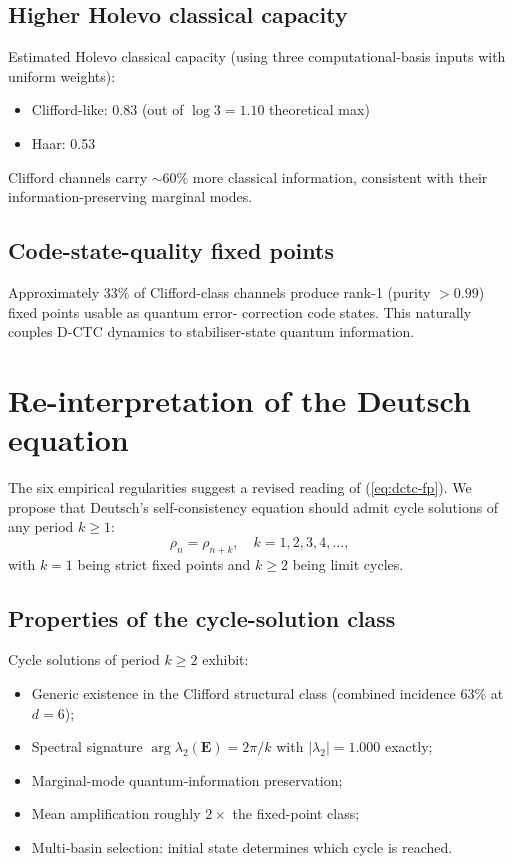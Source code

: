 \documentclass[11pt,a4paper]{article}
\begin{document}
\subsection{Higher Holevo classical capacity}

Estimated Holevo classical capacity (using three computational-basis
inputs with uniform weights):
\begin{itemize}
\item Clifford-like: 0.83 (out of $\log 3 = 1.10$ theoretical max)
\item Haar: 0.53
\end{itemize}
Clifford channels carry $\sim 60\%$ more classical information,
consistent with their information-preserving marginal modes.

\subsection{Code-state-quality fixed points}

Approximately $33\%$ of Clifford-class channels produce
rank-1 (purity $> 0.99$) fixed points usable as quantum error-
correction code states. This naturally couples D-CTC dynamics to
stabiliser-state quantum information.

\section{Re-interpretation of the Deutsch equation}

The six empirical regularities suggest a revised reading of
(\ref{eq:dctc-fp}). We propose that Deutsch's self-consistency
equation should admit cycle solutions of any period $k \ge 1$:
\begin{equation}
\rho_n = \rho_{n + k}, \quad k = 1, 2, 3, 4, \ldots,
\end{equation}
with $k = 1$ being strict fixed points and $k \ge 2$ being limit
cycles.

\subsection{Properties of the cycle-solution class}

Cycle solutions of period $k \ge 2$ exhibit:
\begin{itemize}
\item Generic existence in the Clifford structural class
(combined incidence $63\%$ at $d = 6$);
\item Spectral signature $\arg \lambda_2(\mathbf{E}) = 2\pi/k$ with
$|\lambda_2| = 1.000$ exactly;
\item Marginal-mode quantum-information preservation;
\item Mean amplification roughly $2\times$ the fixed-point class;
\item Multi-basin selection: initial state determines which cycle
is reached.
\end{itemize}
\end{document}
